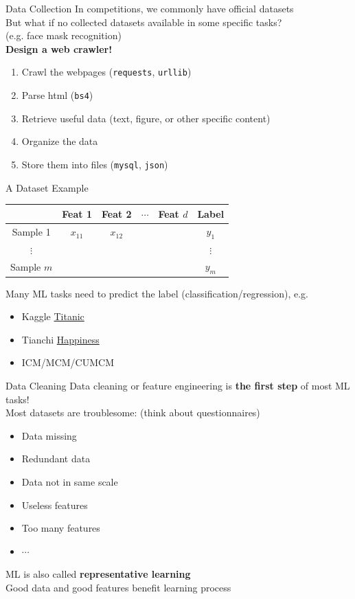 \documentclass{../TexTemplate/myslide}
\begin{document}
\begin{frame}[fragile]{Data Collection}
In competitions, we commonly have official datasets\\
But what if no collected datasets available in some specific tasks?\\
(e.g. face mask recognition)\\
\pause
\textbf{Design a web crawler!}
\begin{enumerate}
	\item Crawl the webpages (\verb'requests', \verb'urllib')
	\item Parse html (\verb'bs4')
	\item Retrieve useful data (text, figure, or other specific content)
	\item Organize the data
	\item Store them into files (\verb'mysql', \verb'json')
\end{enumerate}
\end{frame}

\begin{frame}{A Dataset Example}
\begin{center}
\begin{tabular}{cccccc}\hline
 & Feat 1 & Feat 2 & $\cdots$ & Feat $d$ & Label\\\hline
Sample 1 & $x_{11}$ & $x_{12}$ & & & $y_1$ \\\hline
$\vdots$ & & & & & $\vdots$\\\hline
Sample $m$ & & & & & $y_m$ \\\hline
\end{tabular}
\end{center}
Many ML tasks need to predict the label (classification/regression), e.g.
\begin{itemize}
	\item Kaggle \href{https://www.kaggle.com/c/titanic}{Titanic}
	\item Tianchi \href{https://tianchi.aliyun.com/competition/entrance/231702/introduction?spm=5176.12281973.1005.6.3dd524483PJS4q}{Happiness}
	\item ICM/MCM/CUMCM
\end{itemize}
\end{frame}

\begin{frame}{Data Cleaning}
Data cleaning or feature engineering is \textbf{the first step} of most ML tasks!\\
Most datasets are troublesome: (think about questionnaires)
\begin{itemize}
	\item Data missing
	\item Redundant data
	\item Data not in same scale
	\item Useless features
	\item Too many features
	\item $\cdots$
\end{itemize}
ML is also called \textbf{representative learning}\\
Good data and good features benefit learning process
\end{frame}
\end{document}
